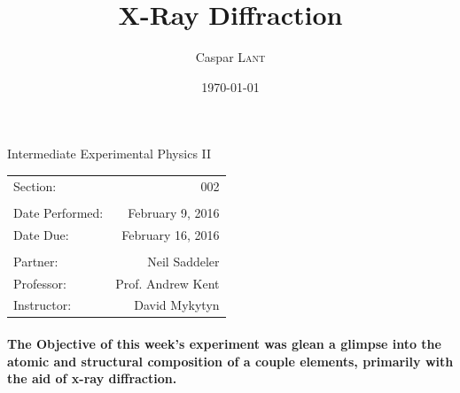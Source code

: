 \documentclass{amsart}
\title{X-Ray Diffraction}
\author{Caspar \textsc{Lant}} %
\date{\today} %
\begin{document}
\bigskip

\maketitle %
\begin{center}

Intermediate Experimental Physics II\\
\vspace{1.5cm}

\begin{tabular}{l r}

Section: & 002\\
\\
Date Performed: & February 9, 2016 \\ %
Date Due: & February 16, 2016\\
\\
Partner: & Neil Saddeler \\ %
Professor: & Prof. Andrew Kent\\
Instructor: & David Mykytyn %
\end{tabular}
\end{center}
\vspace{50mm}
\pagebreak

\paragraph{\textbf{The Objective} of this week's experiment was glean a glimpse into the atomic and structural composition of a couple elements, primarily with the aid of x-ray diffraction. }
\end{document}
